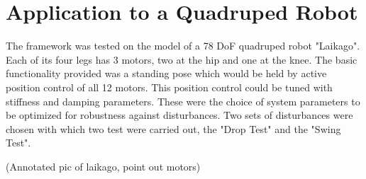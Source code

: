     
    








    


    




\section{Application to a Quadruped Robot} \label{app}
    
    The framework was tested on the model of a 78 DoF quadruped robot "Laikago". Each of its four legs has 3 motors, two at the hip and one at the knee. The basic functionality provided was a standing pose which would be held by active position control of all 12 motors. This position control could be tuned with stiffness and damping parameters. These were the choice of system parameters to be optimized for robustness against disturbances. Two sets of disturbances were chosen with which two test were carried out, the "Drop Test" and the "Swing Test". 

    (Annotated pic of laikago, point out motors)

